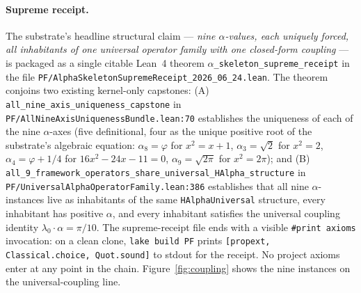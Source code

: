 \documentclass[11pt,a4paper]{amsart}
\theoremstyle{plain}
\theoremstyle{definition}
\begin{document}
\paragraph{Supreme receipt.} The substrate's headline structural claim --- \emph{nine $\alpha$-values, each uniquely forced, all inhabitants of one universal operator family with one closed-form coupling} --- is packaged as a single citable Lean~4 theorem \texttt{$\alpha$\_skeleton\_supreme\_receipt} in the file \texttt{PF/AlphaSkeletonSupremeReceipt\_2026\_06\_24.lean}. The theorem conjoins two existing kernel-only capstones: (A) \texttt{all\_nine\_axis\_uniqueness\_capstone} in \texttt{PF/AllNineAxisUniquenessBundle.lean:70} establishes the uniqueness of each of the nine $\alpha$-axes (five definitional, four as the unique positive root of the substrate's algebraic equation: $\alpha_8=\varphi$ for $x^2=x+1$, $\alpha_3=\sqrt{2}$ for $x^2=2$, $\alpha_4=\varphi+1/4$ for $16x^2-24x-11=0$, $\alpha_9=\sqrt{2\pi}$ for $x^2=2\pi$); and (B) \texttt{all\_9\_framework\_operators\_share\_universal\_HAlpha\_structure} in \texttt{PF/UniversalAlphaOperatorFamily.lean:386} establishes that all nine $\alpha$-instances live as inhabitants of the same \texttt{HAlphaUniversal} structure, every inhabitant has positive $\alpha$, and every inhabitant satisfies the universal coupling identity $\lambda_0 \cdot \alpha = \pi/10$. The supreme-receipt file ends with a visible \texttt{\#print axioms} invocation: on a clean clone, \texttt{lake build PF} prints \texttt{[propext, Classical.choice, Quot.sound]} to stdout for the receipt. No project axioms enter at any point in the chain. Figure~\ref{fig:coupling} shows the nine instances on the universal-coupling line.
\end{document}
